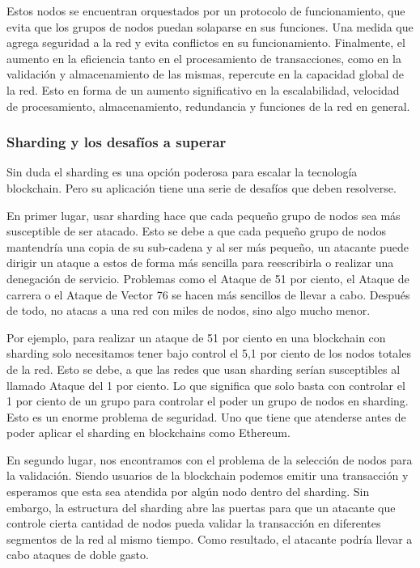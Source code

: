 \documentclass[twoside,twocolumn]{article}
\begin{document}
Estos nodos se encuentran orquestados por un 
protocolo de funcionamiento, que evita que los grupos de 
nodos puedan solaparse en sus funciones. Una medida que agrega seguridad 
a la red y evita conflictos en su funcionamiento.  Finalmente, el aumento en 
la eficiencia tanto en el procesamiento de transacciones, como en la validación
 y almacenamiento de las mismas, repercute en la capacidad global de la red.
  Esto en forma de un aumento significativo en la escalabilidad, velocidad de 
  procesamiento, almacenamiento, 
redundancia y funciones de la red en general.


   
\subsubsection{Sharding y los desafíos a superar}

Sin duda el sharding es una opción poderosa para escalar 
la tecnología blockchain. Pero su aplicación tiene una serie 
de desafíos que deben resolverse.

En primer lugar, usar sharding hace que cada pequeño grupo de
 nodos sea más susceptible de ser atacado. Esto se debe a que
  cada pequeño grupo de nodos mantendría una copia de su sub-cadena
   y al ser más pequeño, un atacante puede dirigir un ataque a estos
    de forma más sencilla para reescribirla o realizar una denegación 
    de servicio. Problemas como el Ataque de 51 por ciento,
 el Ataque de carrera o el Ataque de Vector 76 se hacen más 
 sencillos de llevar a cabo. Después de todo, no atacas a una red
  con miles de nodos, sino algo mucho menor.

Por ejemplo, para realizar un ataque de 51 por ciento
 en una blockchain con sharding solo necesitamos tener bajo 
 control el 5,1 por ciento
  de los nodos totales de la red. Esto se debe,
   a que las redes que usan sharding serían susceptibles 
   al llamado Ataque del 1 por ciento. Lo que significa que solo
    basta con controlar el 1 por ciento
     de un grupo para controlar el poder un grupo de nodos en sharding.
      Esto es un enorme problema de seguridad. Uno que tiene que atenderse
       antes de poder aplicar el sharding en blockchains como Ethereum.

En segundo lugar, nos encontramos con el problema de la selección
 de nodos para la validación. Siendo usuarios de la blockchain podemos
  emitir una transacción y esperamos que esta sea atendida por algún nodo
   dentro del sharding. Sin embargo, la estructura del sharding abre las 
   puertas para que un atacante que controle cierta cantidad de nodos pueda
    validar la transacción en diferentes segmentos de la red al mismo tiempo.
     Como resultado, el atacante podría llevar a cabo ataques de doble gasto.
\end{document}
